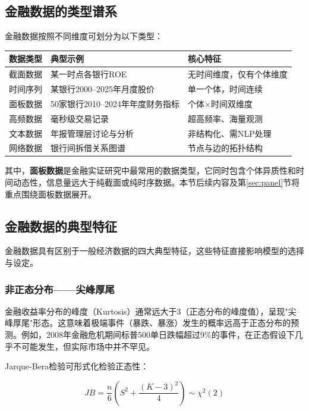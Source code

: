 \subsection{金融数据的类型谱系}

金融数据按照不同维度可划分为以下类型：

\begin{table}[H]
\centering
\begin{tabular}{llp{7cm}}
\toprule
\textbf{数据类型} & \textbf{典型示例} & \textbf{核心特征} \\
\midrule
截面数据 & 某一时点各银行ROE & 无时间维度，仅有个体维度 \\
时间序列 & 某银行2000--2025年月度股价 & 单一个体，时间连续 \\
面板数据 & 50家银行2010--2024年年度财务指标 & 个体$\times$时间双维度 \\
高频数据 & 毫秒级交易记录 & 超高频率、海量观测 \\
文本数据 & 年报管理层讨论与分析 & 非结构化、需NLP处理 \\
网络数据 & 银行间拆借关系图谱 & 节点与边的拓扑结构 \\
\bottomrule
\end{tabular}
\end{table}

其中，\textbf{面板数据}是金融实证研究中最常用的数据类型，它同时包含个体异质性和时间动态性，信息量远大于纯截面或纯时序数据。本节后续内容及第\ref{sec:panel}节将重点围绕面板数据展开。

\subsection{金融数据的典型特征}

金融数据具有区别于一般经济数据的四大典型特征，这些特征直接影响模型的选择与设定。

\subsubsection{非正态分布——尖峰厚尾}

金融收益率分布的峰度（Kurtosis）通常远大于3（正态分布的峰度值），呈现"尖峰厚尾"形态。这意味着极端事件（暴跌、暴涨）发生的概率远高于正态分布的预测。例如，2008年金融危机期间标普500单日跌幅超过9\%的事件，在正态假设下几乎不可能发生，但实际市场中并不罕见。

Jarque-Bera检验可形式化检验正态性：

\[
JB = \frac{n}{6}\left(S^2 + \frac{(K-3)^2}{4}\right) \sim \chi^2(2)
\]

